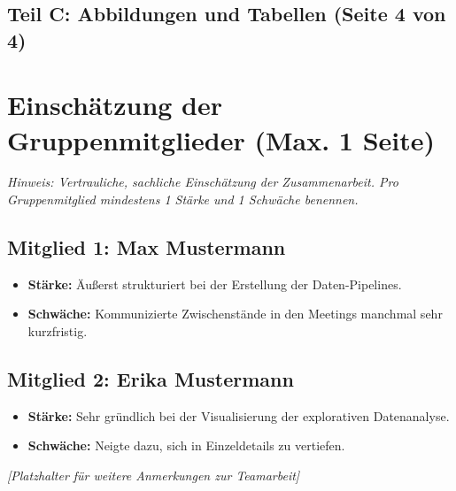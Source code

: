 \documentclass[11pt,a4paper]{article}
\newif\ifsprecherin
\begin{document}
\newpage
\subsection{Teil C: Abbildungen und Tabellen (Seite 4 von 4)}
\lipsum[9-11]

\newpage

\section{Einschätzung der Gruppenmitglieder (Max. 1 Seite)}
\label{sec:einschaetzung}

\textit{Hinweis: Vertrauliche, sachliche Einschätzung der Zusammenarbeit. Pro Gruppenmitglied mindestens 1 Stärke und 1 Schwäche benennen.}

\subsection*{Mitglied 1: Max Mustermann}
\begin{itemize}
    \item \textbf{Stärke:} Äußerst strukturiert bei der Erstellung der Daten-Pipelines.
    \item \textbf{Schwäche:} Kommunizierte Zwischenstände in den Meetings manchmal sehr kurzfristig.
\end{itemize}

\subsection*{Mitglied 2: Erika Mustermann}
\begin{itemize}
    \item \textbf{Stärke:} Sehr gründlich bei der Visualisierung der explorativen Datenanalyse.
    \item \textbf{Schwäche:} Neigte dazu, sich in Einzeldetails zu vertiefen.
\end{itemize}

\vfill
\textit{[Platzhalter für weitere Anmerkungen zur Teamarbeit]}

\newpage

\ifsprecherin
\end{document}
